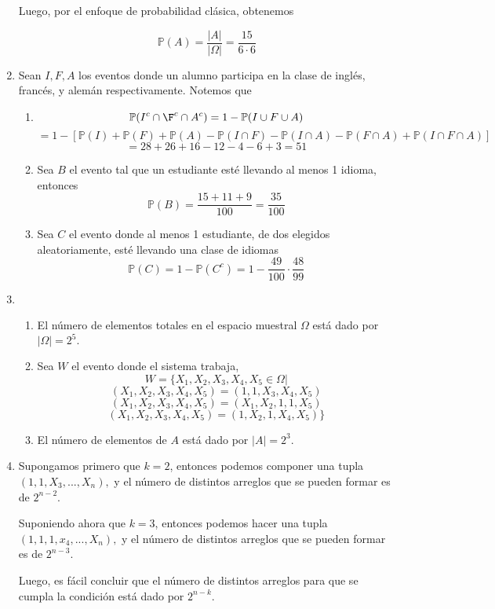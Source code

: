 \documentclass[a4paper]{article}
\begin{document}
\begin{enumerate}
    Luego, por el enfoque de probabilidad clásica, obtenemos
    
    \[ \mathbb{P}(A) = \frac{|A|}{|\Omega|} = \frac{15}{6 \cdot 6}\]
    
    \item Sean $I,F,A$ los eventos donde un alumno participa en la clase de inglés, francés, y alemán respectivamente. Notemos que
    
    \begin{enumerate}
        \item \[ \mathbb{P}(I^c \cap \F^c \cap A^c)= 1 - \mathbb{P}(I \cup F \cup A)\]
        \[= 1- [ \mathbb{P}(I) + \mathbb{P}(F) + \mathbb{P}(A) - \mathbb{P}(I \cap F) - \mathbb{P}(I \cap A) - \mathbb{P}(F \cap A) + \mathbb{P}(I \cap F \cap A)]\] 
        \[= 28 + 26 +16 - 12 - 4-6 +3 = 51\]
        
        \item Sea $B$ el evento tal que un estudiante esté llevando al menos 1 idioma, entonces
        \[ \mathbb{P}(B) = \frac{15+11+9}{100} = \frac{35}{100}\]
        
        \item Sea $C$ el evento donde al menos 1 estudiante, de dos elegidos aleatoriamente, esté llevando una clase de idiomas
        \[ \mathbb{P}(C)= 1- \mathbb{P}(C^c) = 1 - \frac{49}{100} \cdot \frac{48}{99}\] 
    \end{enumerate}
    
    \item \begin{enumerate}
        \item El número de elementos totales en el espacio muestral $\Omega$ está dado por $|\Omega| = 2^5.$
        \item Sea $W$ el evento donde el sistema trabaja,
        \[ W = \{X_1, X_2, X_3, X_4, X_5 \in \Omega | \]
        \[ (X_1, X_2, X_3, X_4, X_5) = (1,1,X_3, X_4, X_5)\]
        \[ (X_1, X_2, X_3, X_4, X_5) = (X_1,X_2,1, 1, X_5)\]
        \[ (X_1, X_2, X_3, X_4, X_5) = (1,X_2,1, X_4, X_5) \}\]
        
        \item El número de elementos de $A$ está dado por $|A| = 2^3.$
    \end{enumerate}
    
    \item Supongamos primero que $k=2$, entonces podemos componer una tupla $(1,1,X_3,...,X_n),$ y el número de distintos arreglos que se pueden formar es de $2^{n-2}.$
    
    Suponiendo ahora que $k=3$, entonces podemos hacer una tupla $(1,1,1,x_4,...,X_n),$ y el número de distintos arreglos que se pueden formar es de $2^{n-3}.$

    Luego, es fácil concluir que el número de distintos arreglos para que se cumpla la condición está dado por $2^{n-k}.$
\end{enumerate}
\end{document}
